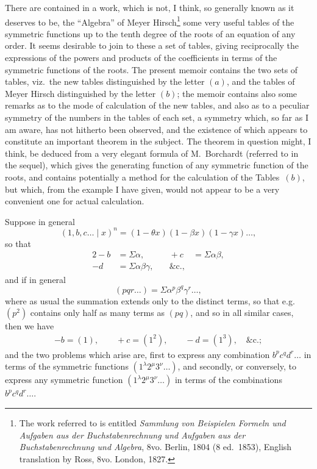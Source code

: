 \documentclass[11pt,a4paper]{book}
\begin{document}
\begin{center}
\normalsize
\setcounter{footnote}{0}

There are contained in a work, which is not, I think, so generally known
as it deserves to be, the ``Algebra'' of Meyer Hirsch\footnote{The work
referred to is entitled \textit{Sammlung von Beispielen Formeln und Aufgaben
aus der Buchstabenrechnung und Aufgaben aus der Buchstabenrechnung und
Algebra}, 8vo. Berlin, 1804 (8 ed.~1853), English translation by Ross, 8vo.
London, 1827.} some very useful tables of the symmetric functions up to the
tenth degree of the roots of an equation of any order. It seems desirable to
join to these a set of tables, giving reciprocally the expressions of the
powers and products of the coefficients in terms of the symmetric functions of
the roots. The present memoir contains the two sets of tables, viz.\ the new
tables distinguished by the letter $(a)$, and the tables of Meyer Hirsch
distinguished by the letter $(b)$; the memoir contains also some remarks as to
the mode of calculation of the new tables, and also as to a peculiar symmetry
of the numbers in the tables of each set, a symmetry which, so far as I am
aware, has not hitherto been observed, and the existence of which appears to
constitute an important theorem in the subject. The theorem in question might,
I think, be deduced from a very elegant formula of M.~Borchardt (referred to in
the sequel), which gives the generating function of any symmetric function of
the roots, and contains potentially a method for the calculation of the
Tables~$(b)$, but which, from the example I have given, would not appear to be
a very convenient one for actual calculation.

Suppose in general
\[
(1, b, c \ldots \mid x)^n = (1 - \theta x)(1 - \beta x)(1 - \gamma x)\ldots,
\]
so that
\begin{alignat*}{2}
-b &= \Sigma\alpha, &\quad +c &= \Sigma\alpha\beta, \\
-d &= \Sigma\alpha\beta\gamma, &\quad \&\text{c.},
\end{alignat*}
and if in general
\[
(pqr\ldots) = \Sigma\alpha^p \beta^q \gamma^r \ldots,
\]
where as usual the summation extends only to the distinct terms, so that
e.g.\ $(p^2)$ contains only half as many terms as $(pq)$, and so in all
similar cases, then we have
\begin{gather*}
-b = (1), \qquad +c = (1^2), \qquad -d = (1^3), \quad \&\text{c.};
\end{gather*}
and the two problems which arise are, first to express any combination
$b^p c^q d^r \ldots$ in terms of the symmetric functions
$(1^{\lambda} 2^{\mu} 3^{\nu}\ldots)$, and secondly, or conversely, to express any
symmetric function $(1^{\lambda} 2^{\mu} 3^{\nu}\ldots)$ in terms of the
combinations $b^p c^q d^r \ldots$.


\end{center}
\end{document}
